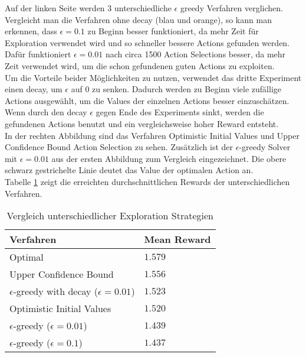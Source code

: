 \documentclass[11pt]{scrartcl}
\begin{document}
\noindent
Auf der linken Seite werden 3 unterschiedliche $\epsilon$ greedy Verfahren verglichen.
Vergleicht man die Verfahren ohne decay (blau und orange), so kann man erkennen, dass
$\epsilon = 0.1$ zu Beginn besser funktioniert, da mehr Zeit für Exploration verwendet
wird und so schneller bessere Actions gefunden werden. Dafür funktioniert $\epsilon =
0.01$ nach circa 1500 Action Selections besser, da mehr Zeit verwendet wird, um die schon
gefundenen guten Actions zu exploiten.\\
Um die Vorteile beider Möglichkeiten zu nutzen, verwendet das dritte Experiment einen
decay, um $\epsilon$ auf $0$ zu senken. Dadurch werden zu Beginn viele zufällige Actions
ausgewählt, um die Values der einzelnen Actions besser einzuschätzen. Wenn durch den decay
$\epsilon$ gegen Ende des Experiments sinkt, werden die gefundenen Actions benutzt und ein
vergleichsweise hoher Reward entsteht.\\
In der rechten Abbildung sind das Verfahren Optimistic Initial Values und Upper Confidence
Bound Action Selection zu sehen. Zusätzlich ist der $\epsilon$-greedy Solver mit
$\epsilon=0.01$ aus der ersten Abbildung zum Vergleich eingezeichnet. Die obere schwarz
gestrichelte Linie deutet das Value der optimalen Action an.\\
Tabelle \ref{tab:explorationstrategies} zeigt die erreichten durchschnittlichen Rewards
der unterschiedlichen Verfahren.

\begin{table}[ht]
  \begin{center}
    \begin{tabular}{l | l}
      \textbf{Verfahren} & \textbf{Mean Reward} \\
      \hline
      Optimal & $1.579$\\
      Upper Confidence Bound & $1.556$ \\
      $\epsilon$-greedy with decay ($\epsilon=0.01$) & $1.523$ \\
      Optimistic Initial Values & $1.520$ \\
      $\epsilon$-greedy ($\epsilon=0.01$) & $1.439$ \\
      $\epsilon$-greedy ($\epsilon=0.1$) & $1.437$ \\
    \end{tabular}

    \caption[ExplorationStrategies]{Vergleich unterschiedlicher Exploration Strategien}
    \label{tab:explorationstrategies}
  \end{center}
\end{table}
\end{document}

